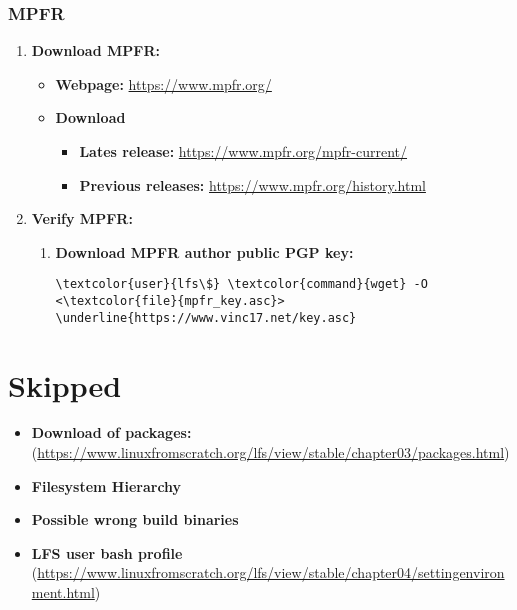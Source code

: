 \documentclass[10pt, a4paper, onecolumn, oneside, titlepage, openany]{book}
\begin{document}
\subsection{MPFR}
\begin{enumerate}
    \item \textbf{Download MPFR:}
    \begin{itemize}
        \item \textbf{Webpage:} \url{https://www.mpfr.org/}
        \item \textbf{Download}
        \begin{itemize}
            \item \textbf{Lates release:} \url{https://www.mpfr.org/mpfr-current/}
            \item \textbf{Previous releases:} \url{https://www.mpfr.org/history.html}
        \end{itemize}
    \end{itemize}
    \item \textbf{Verify MPFR:}
    \begin{enumerate}
        \item \textbf{Download MPFR author public PGP key:}
\begin{Verbatim}[commandchars=\\\{\}]
\textcolor{user}{lfs\$} \textcolor{command}{wget} -O <\textcolor{file}{mpfr_key.asc}> \underline{https://www.vinc17.net/key.asc}
\end{Verbatim}



    \end{enumerate}
\end{enumerate}




\chapter{Skipped}
\begin{itemize}
    \item \textbf{Download of packages:} (\url{https://www.linuxfromscratch.org/lfs/view/stable/chapter03/packages.html})
    \item \textbf{Filesystem Hierarchy}
    \item \textbf{Possible wrong build binaries}
    \item \textbf{LFS user bash profile} (\url{https://www.linuxfromscratch.org/lfs/view/stable/chapter04/settingenvironment.html})
\end{itemize}
\end{document}
